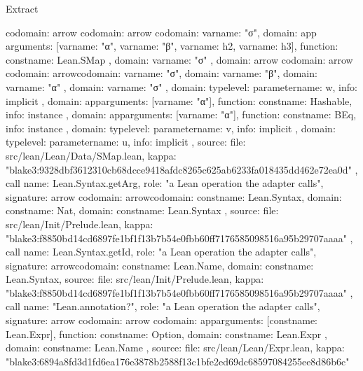 \begin{lexlean}{Extract}
\begin{toolingmodule}
{{{{{{{{                  codomain: arrow{
                    codomain: arrow{
                      codomain: var{name: "σ"},
                      domain: app{
                        arguments: [var{name: "α"}, var{name: "β"}, var{name: h2}, var{name: h3}],
                        function: const{name: Lean.SMap}
                      }
                    },
                    domain: var{name: "σ"}
                  },
                  domain: arrow{
                    codomain: arrow{
                      codomain: arrow{codomain: var{name: "σ"}, domain: var{name: "β"}},
                      domain: var{name: "α"}
                    },
                    domain: var{name: "σ"}
                  }
                },
                domain: type{level: parameter{name: w}},
                info: implicit
              },
              domain: app{arguments: [var{name: "α"}], function: const{name: Hashable}},
              info: instance
            },
            domain: app{arguments: [var{name: "α"}], function: const{name: BEq}},
            info: instance
          },
          domain: type{level: parameter{name: v}},
          info: implicit
        },
        domain: type{level: parameter{name: u}},
        info: implicit
      },
      source: {
        file: src/lean/Lean/Data/SMap.lean,
        kappa: "blake3:9328dbf3612310cb68dcce9418afdc8265c625ab6233fa018435dd462e72ea0d"
      }
    },
    call{
      name: Lean.Syntax.getArg,
      role: "a Lean operation the adapter calls",
      signature: arrow{
        codomain: arrow{codomain: const{name: Lean.Syntax}, domain: const{name: Nat}},
        domain: const{name: Lean.Syntax}
      },
      source: {
        file: src/lean/Init/Prelude.lean,
        kappa: "blake3:f8850bd14cd6897fe1bf1f13b7b54e0fbb60ff7176585098516a95b29707aaaa"
      }
    },
    call{
      name: Lean.Syntax.getId,
      role: "a Lean operation the adapter calls",
      signature: arrow{codomain: const{name: Lean.Name}, domain: const{name: Lean.Syntax}},
      source: {
        file: src/lean/Init/Prelude.lean,
        kappa: "blake3:f8850bd14cd6897fe1bf1f13b7b54e0fbb60ff7176585098516a95b29707aaaa"
      }
    },
    call{
      name: "Lean.annotation?",
      role: "a Lean operation the adapter calls",
      signature: arrow{
        codomain: arrow{
          codomain: app{arguments: [const{name: Lean.Expr}], function: const{name: Option}},
          domain: const{name: Lean.Expr}
        },
        domain: const{name: Lean.Name}
      },
      source: {
        file: src/lean/Lean/Expr.lean,
        kappa: "blake3:6894a8fd3d1fd6ea176e3878b2588f13c1bfe2ed69dc68597084255ee8d86b6c"
}}}
\end{toolingmodule}
\end{lexlean}
